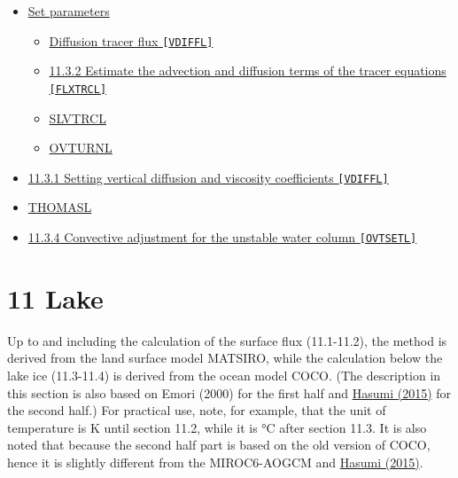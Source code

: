 \begin{itemize}
\begin{itemize}
    \begin{itemize}
    \tightlist
    \item
      \protect\hyperlink{set-parameters}{Set parameters}

      \begin{itemize}
      \tightlist
      \item
        \protect\hyperlink{diffusion-tracer-flux-vdiffl}{Diffusion
        tracer flux \texttt{{[}VDIFFL{]}}}
      \item
        \protect\hyperlink{1132-estimate-the-advection-and-diffusion-terms-of-the-tracer-equations-flxtrcl}{11.3.2
        Estimate the advection and diffusion terms of the tracer
        equations \texttt{{[}FLXTRCL{]}}}
      \item
        \protect\hyperlink{slvtrcl}{SLVTRCL}
      \item
        \protect\hyperlink{ovturnl}{OVTURNL}
      \end{itemize}
    \item
      \protect\hyperlink{1131-setting-vertical-diffusion-and-viscosity-coefficients-vdiffl}{11.3.1
      Setting vertical diffusion and viscosity coefficients
      \texttt{{[}VDIFFL{]}}}
    \item
      \protect\hyperlink{thomasl}{THOMASL}
    \item
      \protect\hyperlink{1134-convective-adjustment-for-the-unstable-water-column-ovtsetl}{11.3.4
      Convective adjustment for the unstable water column
      \texttt{{[}OVTSETL{]}}}
    \end{itemize}
  \end{itemize}
\end{itemize}

\hypertarget{lake}{%
\section{11 Lake}\label{lake}}

Up to and including the calculation of the surface flux (11.1-11.2), the
method is derived from the land surface model MATSIRO, while the
calculation below the lake ice (11.3-11.4) is derived from the ocean
model COCO. (The description in this section is also based on Emori
(2000) for the first half and
\href{https://ccsr.aori.u-tokyo.ac.jp/~hasumi/COCO/coco4.pdf}{Hasumi
(2015)} for the second half.) For practical use, note, for example, that
the unit of temperature is \(\mathrm{K}\) until section 11.2, while it
is \(\mathrm{°C}\) after section 11.3. It is also noted that because the
second half part is based on the old version of COCO, hence it is
slightly different from the MIROC6-AOGCM and
\href{https://ccsr.aori.u-tokyo.ac.jp/~hasumi/COCO/coco4.pdf}{Hasumi
(2015)}.

